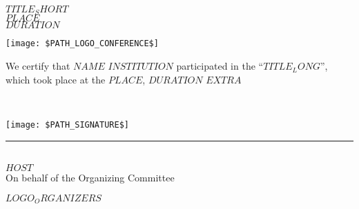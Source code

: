 \documentclass[12pt,landscape]{article}
\begin{document}

\begin{center}
{ \sc \color{customcolor} $TITLE_SHORT$}\\[5pt]
{ \sc $PLACE$}\\
{ \sc $DURATION$}\\
\end{center}

\begin{center}
\texttt{[image: \$PATH\_LOGO\_CONFERENCE\$]}
\end{center}


\begin{center}
\begin{minipage}{0.7\textwidth}
We certify that $NAME$ $INSTITUTION$ participated in the ``$TITLE_LONG$'', which took place at the $PLACE$,
$DURATION$ $EXTRA$
\end{minipage}
\end{center}

\begin{center}
\begin{minipage}{0.15\textwidth}
~
\end{minipage}
\begin{minipage}{0.4\textwidth}
\hskip 20pt\texttt{[image: \$PATH\_SIGNATURE\$]}\\
\rule{8cm}{1pt}\\[5pt]
$HOST$\\
On behalf of the Organizing Committee
\end{minipage}
\begin{minipage}{0.4\textwidth}
$LOGO_ORGANIZERS$
\end{minipage}
\end{center}
\end{document}
